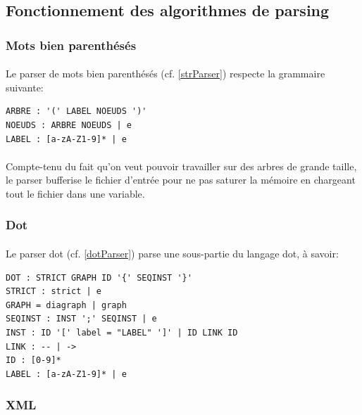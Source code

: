 

	\subsection{Fonctionnement des algorithmes de parsing}

		\subsubsection*{Mots bien parenthésés}
		
\paragraph{}Le parser de mots bien parenthésés (cf. \ref{strParser}) respecte la grammaire suivante:
		
\begin{verbatim}
ARBRE : '(' LABEL NOEUDS ')'
NOEUDS : ARBRE NOEUDS | e
LABEL : [a-zA-Z1-9]* | e
\end{verbatim}

\paragraph{} Compte-tenu du fait qu'on veut pouvoir travailler sur des arbres de grande taille, le parser bufferise le fichier d'entrée pour ne pas saturer la mémoire en chargeant tout le fichier dans une variable.

		\subsubsection*{Dot}
		
\paragraph{}Le parser dot (cf. \ref{dotParser}) parse une sous-partie du langage dot, à savoir:

\begin{verbatim}
DOT : STRICT GRAPH ID '{' SEQINST '}'
STRICT : strict | e
GRAPH = diagraph | graph
SEQINST : INST ';' SEQINST | e
INST : ID '[' label = "LABEL" ']' | ID LINK ID
LINK : -- | ->
ID : [0-9]*
LABEL : [a-zA-Z1-9]* | e
\end{verbatim}

		\subsubsection*{XML}
		
